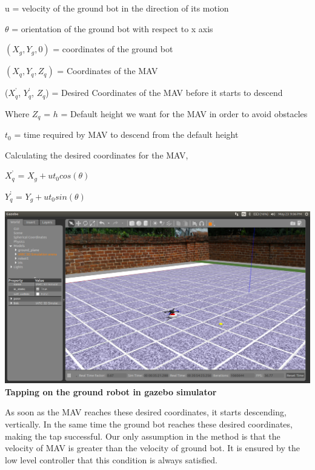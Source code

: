 \documentclass[12pt]{article}
\begin{document}
u = velocity of the ground bot in the direction of its motion 

$\theta$ = orientation of the ground bot with respect to x axis 

$(X_g, Y_g, 0)$ = coordinates of the ground bot 

$(X_q, Y_q, Z_q)$ = Coordinates of the MAV 

($X_q^’$, $Y_q^’$, $Z_q$) = Desired Coordinates of the MAV before it starts to descend 

Where $Z_q$ = $h$ = Default height we want for the MAV in order to avoid obstacles 
        
$t_0$ = time required by MAV to descend from the default height 
 
Calculating the desired coordinates for the MAV, 
 
$X_q^’$ = $X_g + ut_0cos(\theta)$

$Y_q^’$  = $Y_g + ut_0sin(\theta)$ 
\begin{center}\includegraphics[scale=0.15]{tapping} \\
\textbf{Tapping on the ground robot in gazebo simulator}\end{center}
    As soon as the MAV reaches these desired coordinates, it starts descending, vertically. In the same time the ground bot reaches these desired coordinates, making the tap successful. 
    Our only assumption in the method is that the velocity of MAV is greater than the velocity of ground bot. It is ensured by the low level controller that this condition is always satisfied.
\end{document}
